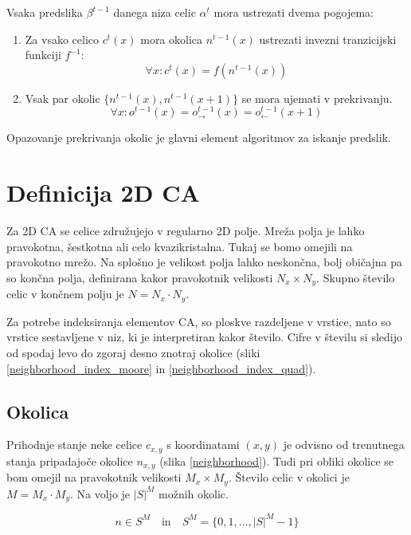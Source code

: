 \documentclass[12pt,a4paper,openany,twoside]{book}
\begin{document}
Vsaka predslika \(\beta^{t-1}\) danega niza celic \(\alpha^t\) mora ustrezati dvema pogojema:
\begin{enumerate}
\item Za vsako celico \(c^{t}(x)\) mora okolica \(n^{t-1}(x)\) ustrezati invezni tranzicijski funkciji \(f^{-1}\):
\begin{equation}
\forall x : c^{t}(x) = f(n^{t-1}(x))
\end{equation}
\item Vsak par okolic \(\{n^{t-1}(x), n^{t-1}(x+1)\}\) se mora ujemati v prekrivanju.
\begin{equation}
\forall x : o^{t-1}(x) = o_{\rightarrow}^{t-1}(x) = o_{\leftarrow}^{t-1}(x+1)
\end{equation}
\end{enumerate}
Opazovanje prekrivanja okolic je glavni element algoritmov za iskanje predslik.

\section{Definicija 2D CA}

Za 2D CA se celice združujejo v regularno 2D polje.
Mreža polja je lahko pravokotna, šestkotna ali celo kvazikristalna.
Tukaj se bomo omejili na pravokotno mrežo.
Na splošno je velikost polja lahko neskončna,
bolj običajna pa so končna polja,
definirana kakor pravokotnik velikosti \(N_x \times N_y\).
Skupno število celic v končnem polju je \(N=N_x \cdot N_y\).

Za potrebe indeksiranja elementov CA, so ploskve razdeljene v vrstice,
nato so vrstice sestavljene v niz, ki je interpretiran kakor število.
Cifre v številu si sledijo od spodaj levo do zgoraj desno znotraj okolice
(sliki \ref{neighborhood_index_moore} in \ref{neighborhood_index_quad}).

\subsection{Okolica}

Prihodnje stanje neke celice \(c_{x,y}\) s koordinatami \((x,y)\)
je odvisno od trenutnega stanja pripadajoče okolice \(n_{x,y}\) (slika \ref{neighborhood}).
Tudi pri obliki okolice se bom omejil na pravokotnik velikosti \(M_x \times M_y\).
Število celic v okolici je \(M=M_x \cdot M_y\).
Na voljo je \({\lvert S \rvert}^M\) možnih okolic.

\begin{equation}
n \in S^M
\quad \textrm{in} \quad
S^M = \{ 0, 1, \ldots, {\lvert S \rvert}^M -1 \}
\end{equation}
\end{document}
